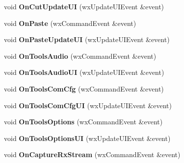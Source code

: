 \begin{DoxyCompactItemize}
\item 
\hypertarget{class_main_frame_ae9222bb34fe54e65f32e9dcde9315d2d}{void {\bfseries On\-Cut\-Update\-U\-I} (wx\-Update\-U\-I\-Event \&event)}\label{class_main_frame_ae9222bb34fe54e65f32e9dcde9315d2d}

\item 
\hypertarget{class_main_frame_af6e53b7f644155f5235a8dfc940ea885}{void {\bfseries On\-Paste} (wx\-Command\-Event \&event)}\label{class_main_frame_af6e53b7f644155f5235a8dfc940ea885}

\item 
\hypertarget{class_main_frame_a096dd35dab302c41ba1d97c21cda5026}{void {\bfseries On\-Paste\-Update\-U\-I} (wx\-Update\-U\-I\-Event \&event)}\label{class_main_frame_a096dd35dab302c41ba1d97c21cda5026}

\item 
\hypertarget{class_main_frame_a82a92e9b1ea9ffdd26badd5b74ee254d}{void {\bfseries On\-Tools\-Audio} (wx\-Command\-Event \&event)}\label{class_main_frame_a82a92e9b1ea9ffdd26badd5b74ee254d}

\item 
\hypertarget{class_main_frame_abecf4d16789e14b0f42177a939eb07f4}{void {\bfseries On\-Tools\-Audio\-U\-I} (wx\-Update\-U\-I\-Event \&event)}\label{class_main_frame_abecf4d16789e14b0f42177a939eb07f4}

\item 
\hypertarget{class_main_frame_a560029fb1c277c79bd932c047ec9effd}{void {\bfseries On\-Tools\-Com\-Cfg} (wx\-Command\-Event \&event)}\label{class_main_frame_a560029fb1c277c79bd932c047ec9effd}

\item 
\hypertarget{class_main_frame_acd3cdef97be73dd70187f21016eeb1cb}{void {\bfseries On\-Tools\-Com\-Cfg\-U\-I} (wx\-Update\-U\-I\-Event \&event)}\label{class_main_frame_acd3cdef97be73dd70187f21016eeb1cb}

\item 
\hypertarget{class_main_frame_a82b97e0f3c4e530d5700b2c2dbac42bf}{void {\bfseries On\-Tools\-Options} (wx\-Command\-Event \&event)}\label{class_main_frame_a82b97e0f3c4e530d5700b2c2dbac42bf}

\item 
\hypertarget{class_main_frame_ac7ceb1e047f2f3b0c26c0b42a110fe99}{void {\bfseries On\-Tools\-Options\-U\-I} (wx\-Update\-U\-I\-Event \&event)}\label{class_main_frame_ac7ceb1e047f2f3b0c26c0b42a110fe99}

\item 
\hypertarget{class_main_frame_a29cacc38a66c9e000f7f512ebf14473b}{void {\bfseries On\-Capture\-Rx\-Stream} (wx\-Command\-Event \&event)}\label{class_main_frame_a29cacc38a66c9e000f7f512ebf14473b}


\end{DoxyCompactItemize}
